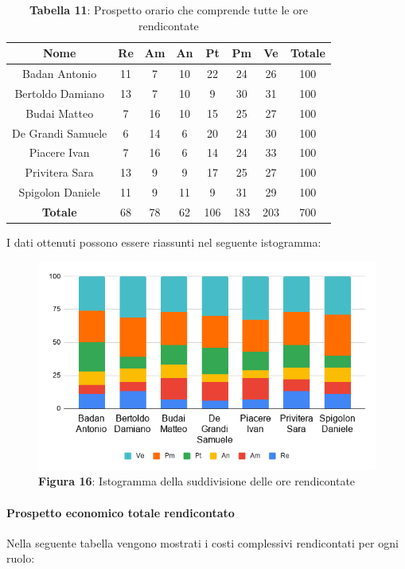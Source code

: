 \begin{table}[H]
	\centering
	\renewcommand{\arraystretch}{1.5}
	\begin{tabular}{|c|c|c|c|c|c|c|c|}
		\hline
		\rowcolor{lighter-grayer}
Nome & Re & Am & An & Pt & Pm & Ve & Totale \\ \hline
Badan Antonio & 11 & 7 & 10 & 22 & 24 & 26 & 100 \\ \hline
Bertoldo Damiano & 13 & 7 & 10 & 9 & 30 & 31 & 100 \\ \hline
Budai Matteo & 7 & 16 & 10 & 15 & 25 & 27 & 100 \\ \hline
De Grandi Samuele & 6 & 14 & 6 & 20 & 24 & 30 & 100 \\ \hline
Piacere Ivan & 7 & 16 & 6 & 14 & 24 & 33 & 100 \\ \hline
Privitera Sara & 13 & 9 & 9 & 17 & 25 & 27 & 100 \\ \hline
Spigolon Daniele & 11 & 9 & 11 & 9 & 31 & 29 & 100 \\ \hline
\textbf{Totale} & 68 & 78 & 62 & 106 & 183 & 203 & 700 \\ \hline
	\end{tabular}
	\caption*{\textbf{Tabella 11}: Prospetto orario che comprende tutte le ore rendicontate\\}
\end{table}	
I dati ottenuti possono essere riassunti nel seguente istogramma:

\begin{figure}[H]
	\centering
	\includegraphics[width=0.7\linewidth]{res/images/IstogrammaTotaleRendicontato.png}
	\caption*{\textbf{Figura 16}: Istogramma della suddivisione delle ore rendicontate}
	\label{fig:Figura10}
\end{figure}

\paragraph{Prospetto economico totale rendicontato}
Nella seguente tabella vengono mostrati i costi complessivi rendicontati per ogni ruolo:

